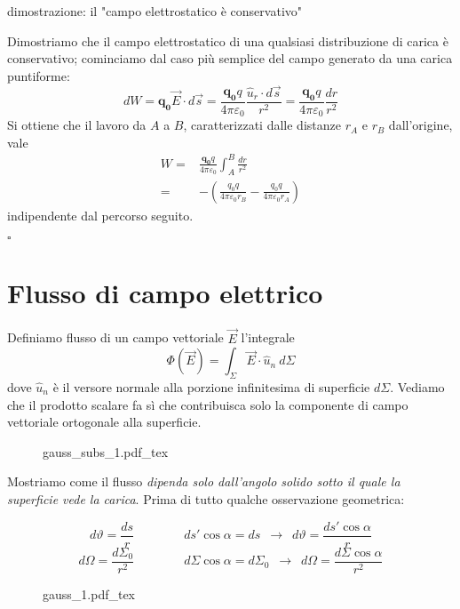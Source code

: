 \documentclass[x11names]{report}
\newcommand*{\QEDB}{\null\nobreak\hfill\ensuremath{\square}}%
\newcommand{\dimostrazione}[2]{
	\begin{dym}{dimostrazione#1}
		#2
		\QEDB
	\end{dym}
}
\newcommand{\incfig}[1]{%
	{#1.pdf_tex}
}
\begin{document}
\dimostrazione{: il "campo elettrostatico è conservativo"}{
	Dimostriamo che il campo elettrostatico di una qualsiasi distribuzione di carica è conservativo; cominciamo dal caso più semplice del campo generato da una carica puntiforme:
	\[
	dW = \boldsymbol{q_0}\vec{E} \cdot d\vec{s} = \frac{\boldsymbol{q_0}q}{4\pi\varepsilon_0} \frac{\hat{u}_r \cdot d\vec{s}}{r^2} =  \frac{\boldsymbol{q_0}q}{4\pi\varepsilon_0} \frac{dr}{r^2}
	\]
	Si ottiene che il lavoro da \(A\) a \(B\), caratterizzati dalle distanze \(r_A\) e \(r_B\) dall'origine, vale
	\begin{align*}\label{sviluppo lavoro}
		W =&  \frac{\boldsymbol{q_0}q}{4\pi\varepsilon_0} \int_A^B  \frac{dr}{r^2} \\
		=& -\left(\frac{q_0 q}{4\pi \varepsilon_0 r_B} - \frac{q_0 q}{4\pi \varepsilon_0 r_A}\right)
	\end{align*}
	indipendente dal percorso seguito.
}

\section{Flusso di campo elettrico}
Definiamo flusso di un campo vettoriale \(\vec{E}\) l'integrale
\[
\Phi (\vec{E}) = \int_{\Sigma} \vec{E}\cdot \hat{u}_n \: d\Sigma
\]
dove \(\hat{u}_n\) è il versore normale alla porzione infinitesima di superficie \(d\Sigma\). Vediamo che il prodotto scalare fa sì che contribuisca solo la componente di campo vettoriale ortogonale alla superficie. 

\begin{figure}[h]
	\centering
	\incfig{gauss_subs_1}
\end{figure}

Mostriamo come il flusso \textit{dipenda solo dall'angolo solido sotto il quale la superficie vede la carica}. Prima di tutto qualche osservazione geometrica:

\[
d\vartheta = \frac{ds}{r} \qquad \qquad ds' \cos\alpha = ds \;\ \to \;\ d\vartheta = \frac{ds'\cos\alpha}{r}
\]
\[
d\Omega= \frac{d\Sigma_0}{r^2} \qquad \qquad d\Sigma \cos\alpha = d\Sigma_0 \;\ \to \;\ d\Omega = \frac{d\Sigma\cos\alpha}{r^2}
\]

\begin{figure}[h]
	\centering
	\incfig{gauss_1}
\end{figure}
\end{document}
